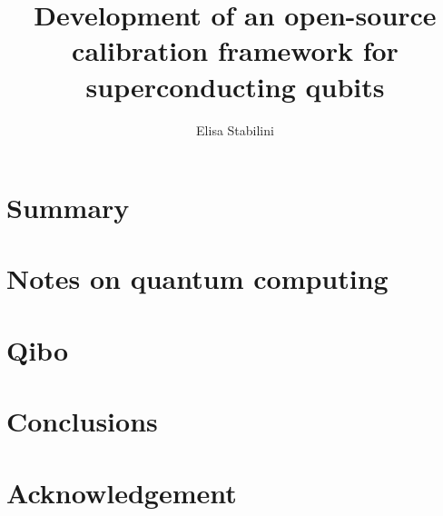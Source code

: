 \documentclass{book}
\title{Development of an open-source calibration framework for superconducting qubits}
\author{Elisa Stabilini}
\date{}
\begin{document}
\frontmatter


\clearpage

\clearpage
\tableofcontents
\clearpage


\chapter*{Summary}

\mainmatter
\chapter{Notes on quantum computing}

\chapter{Qibo}




\chapter{Conclusions}
%

\backmatter
\printbibliography

\chapter*{Acknowledgement}


\end{document}
